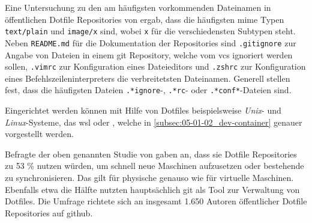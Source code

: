 Eine Untersuchung zu den am häufigsten vorkommenden Dateinamen in öffentlichen Dotfile Repositories von \citeauthor{029:Connecting-the-Dotfiles} ergab, dass die häufigsten \Gls{mime} Typen \texttt{text/plain} und \texttt{image/x} sind, wobei \texttt{x} für die verschiedensten Subtypen steht. Neben \texttt{README.md} für die Dokumentation der Repositories sind \texttt{.gitignore} zur Angabe von Dateien in einem \Gls{git} Repository, welche vom \Gls{vcs} ignoriert werden sollen, \texttt{.vimrc} zur Konfiguration eines Dateieditors und \texttt{.zshrc} zur Konfiguration eines Befehlszeileninterpreters die verbreitetsten Dateinamen. Generell stellen \citeauthor{029:Connecting-the-Dotfiles} fest, dass die häufigsten Dateien \texttt{.*ignore}-, \texttt{.*rc}- oder \texttt{.*conf*}-Dateien sind. \cite{029:Connecting-the-Dotfiles}

Eingerichtet werden können mit Hilfe von Dotfiles beispielsweise \textit{Unix}- und \textit{Linux}-Systeme, das \Gls{wsl} oder  \cite{203:Dev-Environment-as-a-Code-with-DevContainers-Dotfiles-and-GitHub-Codespaces}, welche in \autoref{subsec:05-01-02_dev-container} genauer vorgestellt werden.

Befragte der oben genannten Studie von \citeauthor{029:Connecting-the-Dotfiles} gaben an, dass sie Dotfile Repositories zu 53 \% nutzen würden, um schnell neue Maschinen aufzusetzen oder bestehende zu synchronisieren. Das gilt für physische genauso wie für virtuelle Maschinen. Ebenfalls etwa die Hälfte nutzten hauptsächlich \Gls{git} als Tool zur Verwaltung von Dotfiles. Die Umfrage richtete sich an insgesamt 1.650 Autoren öffentlicher Dotfile Repositories auf \Gls{github}. \cite{029:Connecting-the-Dotfiles}
